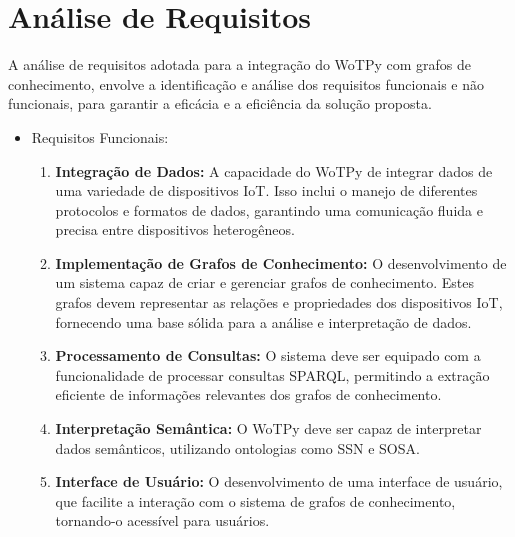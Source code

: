 \section{Análise de Requisitos}

A análise de requisitos adotada para a integração do WoTPy com grafos de conhecimento, envolve a identificação e análise dos requisitos funcionais e não funcionais, para garantir a eficácia e a eficiência da solução proposta.

\begin{itemize}
    \item Requisitos Funcionais:
    \begin{enumerate}
        \item \textbf{Integração de Dados:} A capacidade do WoTPy de integrar dados de uma variedade de dispositivos IoT. Isso inclui o manejo de diferentes protocolos e formatos de dados, garantindo uma comunicação fluida e precisa entre dispositivos heterogêneos.
        \item \textbf{Implementação de Grafos de Conhecimento:} O desenvolvimento de um sistema capaz de criar e gerenciar grafos de conhecimento. Estes grafos devem representar as relações e propriedades dos dispositivos IoT, fornecendo uma base sólida para a análise e interpretação de dados.
        \item \textbf{Processamento de Consultas:} O sistema deve ser equipado com a funcionalidade de processar consultas SPARQL, permitindo a extração eficiente de informações relevantes dos grafos de conhecimento.
        \item \textbf{Interpretação Semântica:} O WoTPy deve ser capaz de interpretar dados semânticos, utilizando ontologias como SSN e SOSA.
        \item \textbf{Interface de Usuário:} O desenvolvimento de uma interface de usuário, que facilite a interação com o sistema de grafos de conhecimento, tornando-o acessível para usuários.
    \end{enumerate}


\end{itemize}
